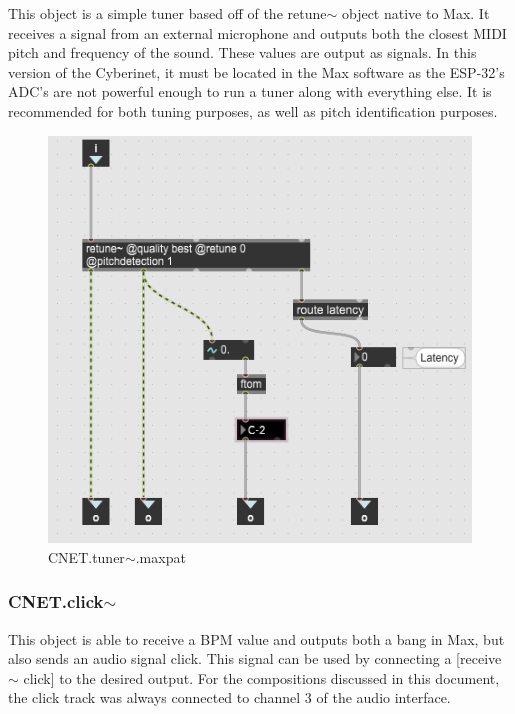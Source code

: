 This object is a simple tuner based off of the retune$\sim$ object native to Max. It receives a signal from an external microphone and outputs both the closest MIDI pitch and frequency of the sound. These values are output as signals. In this version of the Cyberinet, it must be located in the Max software as the ESP-32's ADC's are not powerful enough to run a tuner along with everything else. It is recommended for both tuning purposes, as well as pitch identification purposes. 

\begin{figure}
    \centering
    \includegraphics[scale=0.2]{diagrams/maxPatches/CNET.tuner~.png}
    \caption{CNET.tuner$\sim$.maxpat}
    \label{fig:CNET.tuner~.maxpat}
\end{figure}
 

\subsubsection{CNET.click$\sim$}
This object is able to receive a BPM value and outputs both a bang in Max, but also sends an audio signal click. This signal can be used by connecting a [receive$\sim$ click] to the desired output. For the compositions discussed in this document, the click track was always connected to channel 3 of the audio interface.

